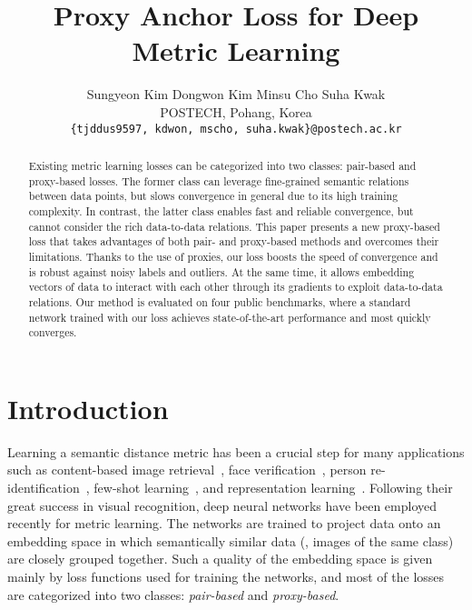 \documentclass[10pt,twocolumn,letterpaper]{article}
\begin{document}
\title{Proxy Anchor Loss for Deep Metric Learning}



\author{
Sungyeon Kim \qquad
Dongwon Kim \qquad
Minsu Cho \qquad
Suha Kwak\\
POSTECH, Pohang, Korea\\
{\tt\small \{tjddus9597, kdwon, mscho, suha.kwak\}@postech.ac.kr}
}



\maketitle
\thispagestyle{empty}



\begin{abstract}
\label{sec:abstract}
Existing metric learning losses can be categorized into two classes: pair-based and proxy-based losses. 
The former class can leverage fine-grained semantic relations between data points, but slows convergence in general due to its high training complexity.
In contrast, the latter class enables fast and reliable convergence, but cannot consider the rich data-to-data relations.
This paper presents a new proxy-based loss that takes advantages of both pair- and proxy-based methods and overcomes their limitations.
Thanks to the use of proxies, our loss boosts the speed of convergence and is robust against noisy labels and outliers.
At the same time, it allows embedding vectors of data to interact with each other through its gradients to exploit data-to-data relations.
Our method is evaluated on four public benchmarks, where a standard network trained with our loss achieves state-of-the-art performance and most quickly converges.
\end{abstract}

 



\section{Introduction}
\label{sec:intro}


Learning a semantic distance metric has been a crucial step for many applications such as content-based image retrieval~\cite{movshovitz2017no,songCVPR16,Sohn_nips2016,kim2019deep}, face verification~\cite{Schroff2015, liu2017sphereface}, person re-identification~\cite{Chen_2017_CVPR,xiao2017joint}, few-shot learning~\cite{snell2017prototypical, sung2018learning, Qiao_2019_ICCV}, and representation learning~\cite{kim2019deep,Wang2015,Zagoruyko_CVPR_2015}.
Following their great success in visual recognition, deep neural networks have been employed recently for metric learning.
The networks are trained to project data onto an embedding space
in which semantically similar data (\eg, images of the same class) are closely grouped together.
Such a quality of the embedding space is given mainly by loss functions used for training the networks, and most of the losses are categorized into two classes: \emph{pair-based} and \emph{proxy-based}.
\end{document}
